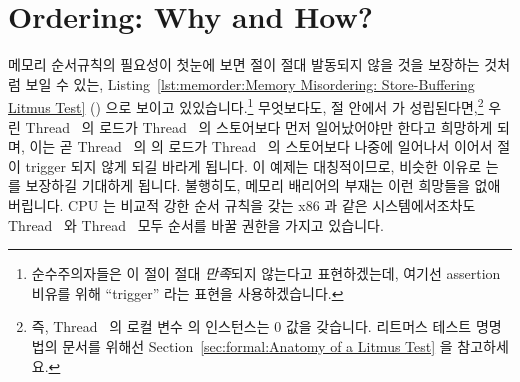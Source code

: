 \section{Ordering: Why and How?}
\label{sec:memorder:Ordering: Why and How?}

메모리 순서규칙의 필요성이 첫눈에 보면  절이 절대 발동되지 않을 것을
보장하는 것처럼 보일 수 있는,
Listing~\ref{lst:memorder:Memory Misordering: Store-Buffering Litmus Test}
()
으로 보이고 있있습니다.\footnote{
	순수주의자들은 이  절이 절대 \emph{만족}되지 않는다고
	표현하겠는데, 여기선 assertion 비유를 위해 ``trigger'' 라는 표현을
	사용하겠습니다.}
무엇보다도,  절 안에서  가 성립된다면,\footnote{
	즉, Thread~ 의 로컬 변수  의 인스턴스는 0 값을
	갖습니다.
	리트머스 테스트 명명법의 문서를 위해선
	Section~\ref{sec:formal:Anatomy of a Litmus Test} 을 참고하세요.}
우린 Thread~ 의  로드가 Thread~ 의  스토어보다
먼저 일어났어야만 한다고 희망하게 되며, 이는 곧 Thread~ 의  의
로드가 Thread~ 의  스토어보다 나중에 일어나서 
이어서  절이 trigger 되지 않게 되길 바라게 됩니다.
이 예제는 대칭적이므로, 비슷한 이유로  는  를
보장하길 기대하게 됩니다.
불행히도, 메모리 배리어의 부재는 이런 희망들을 없애버립니다.
CPU 는 비교적 강한 순서 규칙을 갖는 x86 과 같은 시스템에서조차도
Thread~ 와 Thread~ 모두 순서를 바꿀 권한을 가지고 있습니다.

